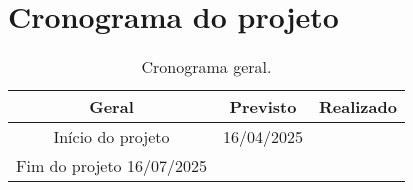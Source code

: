 
\chapter{Cronograma do projeto}

\begin{table}[htpb]
\begin{center}
\caption{Cronograma geral.}
\begin{tabular}{|c|c|c|}
\hline
\textbf{Geral}          & \textbf{Previsto} & \textbf{Realizado} \\ \hline
Início do projeto  & 16/04/2025 &          \\ \hline
Fim do projeto  16/07/2025 &        &         \\ \hline
\end{tabular}
\end{center}
\end{table}

